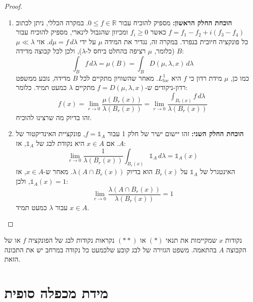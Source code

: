 \documentclass{tstextbook}
\begin{document}
\begin{proof}
  \begin{enumerate}
    \item \textbf{הוכחת החלק הראשון:} 
מספיק להוכיח עבור \(0 \leq f \in \mathbb{R}\). במקרה הכללי, ניתן לכתוב \(f = f_1 - f_2 + i(f_3 - f_4)\) כאשר \(f_i \geq 0\) ומכיוון שהגבול לינארי, מספיק להוכיח עבור כל פונקציה חיובית בנפרד.
במקרה זה, נגדיר את המידה \(\mu\) על ידי \(d\mu = f \, d\lambda\). אזי \(\mu \ll \lambda\) (כלומר, \(\mu\) רציפה בהחלט ביחס ל-\(\lambda\)), ולכן לכל קבוצה מדידה \(B\):
$$ \int_B f \, d\lambda = \mu(B) = \int_B D(\mu, \lambda, x) \, d\lambda $$
כמו כן, \(\mu\) מידת רדון כי \(f\) היא \(L^1_{loc}\).
מאחר שהשוויון מתקיים לכל \(B\) מדידה, נובע ממשפט רדון-ניקודים ש-\(f = D(\mu, \lambda, x)\) מתקיים \(\lambda\) כמעט תמיד. כלומר:
$$ f(x) = \lim_{r \to 0} \frac{\mu(B_r(x))}{\lambda(B_r(x))} = \lim_{r \to 0} \frac{\int_{B_r(x)} f \, d\lambda}{\lambda(B_r(x))} $$
זהו בדיוק מה שרצינו להוכיח.


    \item \textbf{הוכחת החלק השני:} 
זהו יישום ישיר של חלק 1 עבור \(f = \mathbb{1}_A\), פונקציית האינדיקטור של \(A\). אם \(x \in A\) היא נקודת לבג של \(\mathbb{1}_A\), אז:
$$ \lim_{r \to 0} \frac{1}{\lambda(B_r(x))} \int_{B_r(x)} \mathbb{1}_A \, d\lambda = \mathbb{1}_A(x) $$
האינטגרל של \(\mathbb{1}_A\) על \(B_r(x)\) הוא בדיוק \(\lambda(A \cap B_r(x))\). מאחר ש-\(x \in A\), אז \(\mathbb{1}_A(x) = 1\), ולכן:
$$ \lim_{r \to 0} \frac{\lambda(A \cap B_r(x))}{\lambda(B_r(x))} = 1 $$
עבור \(\lambda\) כמעט תמיד \(x \in A\).


  \end{enumerate}
\end{proof}
\begin{remark}
נקודות \(x\) שמקיימות את תנאי \((*)\) או \((**)\) נקראות נקודות לבג של הפונקציה \(f\) או של הקבוצה \(A\) בהתאמה. משפט הגזירה של לבג קובע שלכמעט כל נקודה במרחב יש את התכונה הזאת.

\end{remark}

\section{מידת מכפלה סופית}
\end{document}
